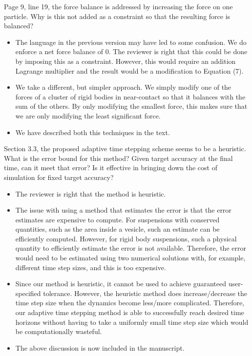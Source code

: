 \documentclass[11pt]{article}
\newcommand{\comment}[1]{{\color{blue} #1}}
\begin{document}
\noindent
\comment{Page 9, line 19, the force balance is addressed by increasing
the force on one particle.  Why is this not added as a constraint so
that the resulting force is balanced?}
\begin{itemize}
  \item The language in the previous version may have led to some
    confusion.  We do enforce a net force balance of 0.  The reviewer is
    right that this could be done by imposing this as a constraint.
    However, this would require an addition Lagrange multiplier and
    the result would be a modification to Equation (7).  
    
  \item We take a different, but simpler approach.  We simply modify one
    of the forces of a cluster of rigid bodies in near-contact so that
    it balances with the sum of the others.  By only modifying the
    smallest force, this makes sure that we are only modifying the least
    significant force.

  \item We have described both this techniques in the text.

\end{itemize}

\noindent
\comment{Section 3.3, the proposed adaptive time stepping scheme seems
  to be a heuristic.  What is the error bound for this method?  Given
  target accuracy at the final time, can it meet that error?  Is it
  effective in bringing down the cost of simulation for fixed target
accuracy?}
\begin{itemize}
  \item The reviewer is right that the method is heuristic.

  \item The issue with using a method that estimates the error is that
    the error estimates are expensive to compute.  For suspensions with
    conserved quantities, such as the area inside a vesicle, such an
    estimate can be efficiently computed.  However, for rigid body
    suspensions, such a physical quantity to efficiently estimate the
    error is not available.  Therefore, the error would need to be
    estimated using two numerical solutions with, for example, different
    time step sizes, and this is too expensive.  

  \item Since our method is heuristic, it cannot be used to achieve
    guaranteed user-specified tolerance.  However, the heuristic method
    does increase/decrease the time step size when the dynamics become
    less/more complicated.  Therefore, our adaptive time stepping method
    is able to successfully reach desired time horizons without having
    to take a uniformly small time step size which would be
    computationally wasteful.

  \item The above discussion is now included in the manuscript.

\end{itemize}
\end{document}
